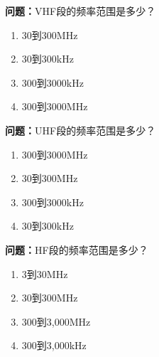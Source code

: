 \textbf{问题：}VHF段的频率范围是多少？
\begin{enumerate}[label=\Alph*), leftmargin=3em]
	\item 30到300MHz
	\item 30到300kHz
	\item 300到3000kHz
	\item 300到3000MHz
\end{enumerate}

\textbf{问题：}UHF段的频率范围是多少？
\begin{enumerate}[label=\Alph*), leftmargin=3em]
	\item 300到3000MHz
	\item 30到300MHz
	\item 300到3000kHz
	\item 30到300kHz
\end{enumerate}

\textbf{问题：}HF段的频率范围是多少？
\begin{enumerate}[label=\Alph*), leftmargin=3em]
	\item 3到30MHz
	\item 30到300MHz
	\item 300到3,000MHz
	\item 300到3,000kHz
\end{enumerate}




